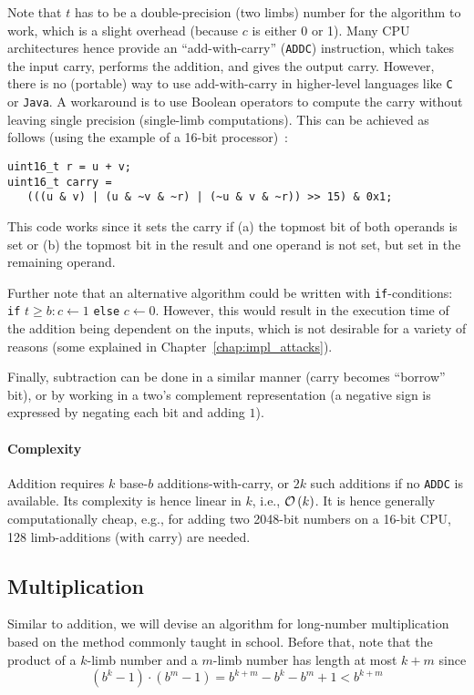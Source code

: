Note that $t$ has to be a double-precision (two limbs) number for the algorithm to work, which is a slight overhead (because $c$ is either 0 or 1). Many \ac{CPU} architectures hence provide an ``add-with-carry'' (\verb+ADDC+) instruction, which takes the input carry, performs the addition, and gives the output carry. However, there is no (portable) way to use add-with-carry in higher-level languages like \verb+C+ or \verb+Java+. 
A workaround is to use Boolean operators to compute the carry without leaving single precision (single-limb computations). This can be achieved as follows (using the example of a 16-bit processor)~\cite{SOInt}:

\lstset{language=C}
\begin{lstlisting}
uint16_t r = u + v;
uint16_t carry = 
   (((u & v) | (u & ~v & ~r) | (~u & v & ~r)) >> 15) & 0x1;
\end{lstlisting}

This code works since it sets the carry if (a) the topmost bit of both operands is set or (b) the topmost bit in the result and one operand is not set, but set in the remaining operand.

Further note that an alternative algorithm could be written with \verb+if+-conditions: \verb+if+ $t \geq b: c \gets 1$ \verb+else+ $c \gets 0$. However, this would result in the execution time of the addition being dependent on the inputs, which is not desirable for a variety of reasons (some explained in Chapter~\ref{chap:impl_attacks}).

Finally, subtraction can be done in a similar manner (carry becomes ``borrow'' bit), or by working in a two's complement representation (a negative sign is expressed by negating each bit and adding $1$). 

\paragraph{Complexity} Addition requires $k$ base-$b$ additions-with-carry, or $2k$ such additions if no \verb+ADDC+ is available. Its complexity is hence linear in $k$, i.e., $\mathcal{O} \left(k\right)$. It is hence generally computationally cheap, e.g., for adding two 2048-bit numbers on a 16-bit \ac{CPU}, 128 limb-additions (with carry) are needed.

\subsection{Multiplication}
\label{sec:asymmetric_crypto:mul}
Similar to addition, we will devise an algorithm for long-number multiplication based on the method commonly taught in school. Before that, note that the product of a $k$-limb number and a $m$-limb number has length at most $k + m$ since 
$$\left(b^k -1 \right) \cdot \left(b^m - 1\right) = b^{k + m} - b^k - b^m + 1 < b^{k+m}$$

